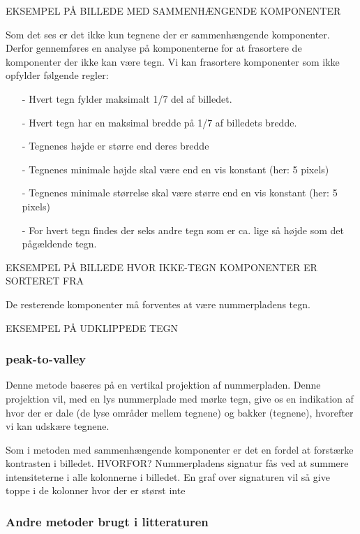 EKSEMPEL PÅ BILLEDE MED SAMMENHÆNGENDE KOMPONENTER

Som det ses er det ikke kun tegnene der er sammenhængende komponenter. Derfor gennemføres en analyse på komponenterne for at frasortere de komponenter der ikke kan være tegn. Vi kan frasortere komponenter som ikke opfylder følgende regler:

\begin{itemize}
\item[-] Hvert tegn fylder maksimalt 1/7 del af billedet.
\item[-] Hvert tegn har en maksimal bredde på 1/7 af billedets bredde.
\item[-] Tegnenes højde er større end deres bredde
\item[-] Tegnenes minimale højde skal være end en vis konstant (her: 5 pixels)
\item[-] Tegnenes minimale størrelse skal være større end en vis konstant (her: 5 pixels)
\item[-] For hvert tegn findes der seks andre tegn som er ca. lige så højde som det pågældende tegn.
\end{itemize}

EKSEMPEL PÅ BILLEDE HVOR IKKE-TEGN KOMPONENTER ER SORTERET FRA

De resterende komponenter må forventes at være nummerpladens tegn.

EKSEMPEL PÅ UDKLIPPEDE TEGN


\subsubsection*{peak-to-valley}

Denne metode baseres på en vertikal projektion af nummerpladen. Denne projektion vil, med en lys nummerplade med mørke tegn, give os en indikation af hvor der er dale (de lyse områder mellem tegnene) og bakker (tegnene), hvorefter vi kan udskære tegnene.

Som i metoden med sammenhængende komponenter er det en fordel at forstærke kontrasten i billedet. HVORFOR? Nummerpladens signatur fås ved at summere intensiteterne i alle kolonnerne i billedet. En graf over signaturen vil så give toppe i de kolonner hvor der er størst inte

\subsubsection*{Andre metoder brugt i litteraturen}



